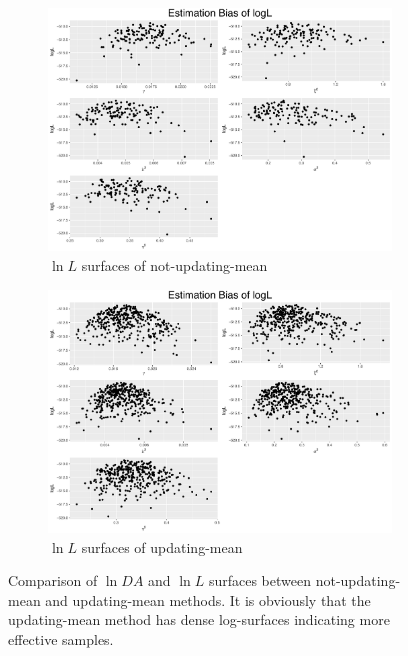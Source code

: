 \begin{figure}[h]
\begin{subfigure}[t]{0.45\textwidth}
	\includegraphics[width=\textwidth]{Chapters/05MCMCOU/plots/realdataestbiaslogLnoupdate.pdf}
	\caption{$\ln L$ surfaces of not-updating-mean}
\end{subfigure}
\begin{subfigure}[t]{0.45\textwidth}
	\includegraphics[width=\textwidth]{Chapters/05MCMCOU/plots/realdataestbiaslogLupdate.pdf}
	\caption{$\ln L$ surfaces of updating-mean}
\end{subfigure}
\caption{Comparison of $\ln DA$ and $\ln L$ surfaces between not-updating-mean and updating-mean methods. It is obviously that the updating-mean method has dense log-surfaces indicating more effective samples.} \label{comparenotanupDAL}
\end{figure}

